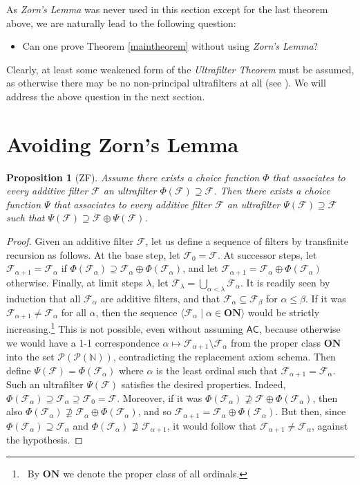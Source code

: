 \documentclass{amsart}
\newtheorem{proposition}[theorem]{Proposition}
\theoremstyle{definition}
\theoremstyle{remark}
\def\F{\mathscr{F}}
\def\N{\mathbb{N}}
\begin{document}
As \emph{Zorn's Lemma} was never used in this section
except for the last theorem above, we are naturally lead to
the following question:

\smallskip
\begin{itemize}
\item
Can one prove Theorem \ref{maintheorem} without
using \emph{Zorn's Lemma}?
\end{itemize}

\smallskip
Clearly, at least some weakened form of the 
\emph{Ultrafilter Theorem} must be assumed, as otherwise
there may be no non-principal ultrafilters at all (see \cite{hr}). 
We will address the above
question in the next section.

\medskip
\section{Avoiding Zorn's Lemma}

\begin{proposition}[\textsf{ZF}]\label{step-one}
Assume there exists a choice function $\Phi$ that
associates to every additive filter $\F$
an ultrafilter $\Phi(\F)\supseteq\F$. Then
there exists a choice function $\Psi$ that
associates to every additive filter $\F$ an
ultrafilter $\Psi(\F)\supseteq\F$ such that
$\Psi(\F)\supseteq\F\oplus\Psi(\F)$.
\end{proposition}

\begin{proof}
Given an additive filter $\F$, let us define a sequence of filters
by transfinite recursion as follows.
At the base step, let $\F_0=\F$. At successor steps, 
let $\F_{\alpha+1}=\F_\alpha$ if
$\Phi(\F_\alpha)\supseteq\F_\alpha\oplus\Phi(\F_\alpha)$,
and let $\F_{\alpha+1}=\F_\alpha\oplus\Phi(\F_\alpha)$
otherwise. Finally, at limit steps $\lambda$, let 
$\F_\lambda=\bigcup_{\alpha<\lambda}\F_\alpha$.
It is readily seen by induction that all $\F_\alpha$
are additive filters, and that $\F_\alpha\subseteq\F_\beta$
for $\alpha\le\beta$.
If it was $\F_{\alpha+1}\ne\F_\alpha$
for all $\alpha$, then the sequence
$\langle\F_\alpha\mid\alpha\in\textbf{ON}\rangle$ 
would be strictly increasing.\footnote
{~By $\textbf{ON}$ we denote the proper class of all ordinals.} 
This is not possible, even without assuming $\textsf{AC}$,
because otherwise we would have a 1-1 correspondence
$\alpha\mapsto\F_{\alpha+1}\setminus\F_\alpha$
from the proper class $\textbf{ON}$
into the set $\mathcal{P}(\mathcal{P}(\N))$,
contradicting the replacement axiom schema.
Then define $\Psi(\F)=\Phi(\F_\alpha)$
where $\alpha$ is the least ordinal such that
$\F_{\alpha+1}=\F_\alpha$.
Such an ultrafilter $\Psi(\F)$ satisfies 
the desired properties. Indeed, 
$\Phi(\F_\alpha)\supseteq\F_\alpha\supseteq\F_0=\F$.
Moreover, if it was 
$\Phi(\F_\alpha)\not\supseteq\F\oplus\Phi(\F_\alpha)$,
then also
$\Phi(\F_\alpha)\not\supseteq\F_\alpha\oplus\Phi(\F_\alpha)$,
and so $\F_{\alpha+1}=\F_\alpha\oplus\Phi(\F_\alpha)$.
But then, since $\Phi(\F_\alpha)\supseteq\F_\alpha$
and $\Phi(\F_\alpha)\not\supseteq\F_{\alpha+1}$,
it would follow that
$\F_{\alpha+1}\ne\F_\alpha$, against the hypothesis.
\end{proof}
\end{document}
